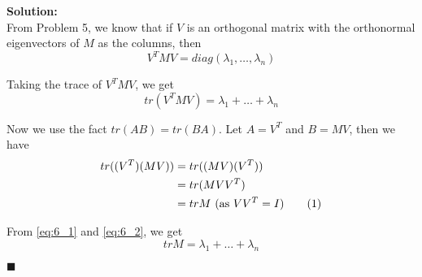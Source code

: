 \documentclass[12pt,a4paper]{article}
\newcommand\numberthis{\addtocounter{equation}{1}\tag{\theequation}}
\newcommand{\rightqed}{
\begin{flushright}
$\blacksquare$
\end{flushright}
}
\newcommand{\solution}{\noindent\textbf{Solution:}\\}
\begin{document}
\solution

From Problem 5, we know that if $V$ is an orthogonal matrix with the orthonormal eigenvectors of $M$ as the columns, then
\begin{equation}
    V^TMV = diag(\lambda_1, \hdots, \lambda_n)
\end{equation}

Taking the trace of $V^TMV$, we get
\begin{equation}
    tr (V^TMV) = \lambda_1 + \hdots + \lambda_n \label{eq:6_1}
\end{equation}

Now we use the fact $tr (AB) = tr (BA)$. Let $A = V^T$ and $B = MV$, then we have
\begin{align*}
    tr ((V^T)(MV)) &= tr ((MV)(V^T)) \\
                   &= tr (MVV^T) \\
                   &= tr M \text{ (as $VV^T = I$)} \numberthis \label{eq:6_2}
\end{align*}

From \eqref{eq:6_1} and \eqref{eq:6_2}, we get
\begin{equation}
    tr M = \lambda_1 + \hdots + \lambda_n
\end{equation}
\rightqed
\end{document}

